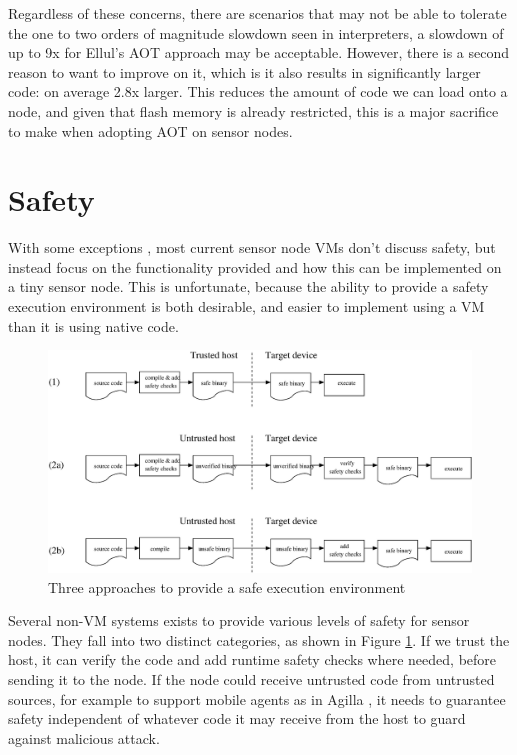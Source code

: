 Regardless of these concerns, there are scenarios that may not be able to tolerate the one to two orders of magnitude slowdown seen in interpreters, a slowdown of up to 9x for Ellul's AOT approach may be acceptable. However, there is a second reason to want to improve on it, which is it also results in significantly larger code: on average 2.8x larger. This reduces the amount of code we can load onto a node, and given that flash memory is already restricted, this is a major sacrifice to make when adopting AOT on sensor nodes.


\section{Safety}
\label{sec-state-of-the-art-safety}
With some exceptions \cite{Evers:2010ur}, most current sensor node VMs don't discuss safety, but instead focus on the functionality provided and how this can be implemented on a tiny sensor node. This is unfortunate, because the ability to provide a safety execution environment is both desirable, and easier to implement using a VM than it is using native code.

\begin{figure}[]
  \centering
  \includegraphics[width=0.8\linewidth]{safe-compilation-process.eps}
  \caption{Three approaches to provide a safe execution environment}
  \label{fig-safe-compilation-process}
\end{figure}

Several non-VM systems exists to provide various levels of safety for sensor nodes. They fall into two distinct categories, as shown in Figure \ref{fig-safe-compilation-process}. If we trust the host, it can verify the code and add runtime safety checks where needed, before sending it to the node. If the node could receive untrusted code from untrusted sources, for example to support mobile agents as in Agilla \cite{Fok:2005bh}, it needs to guarantee safety independent of whatever code it may receive from the host to guard against malicious attack.

